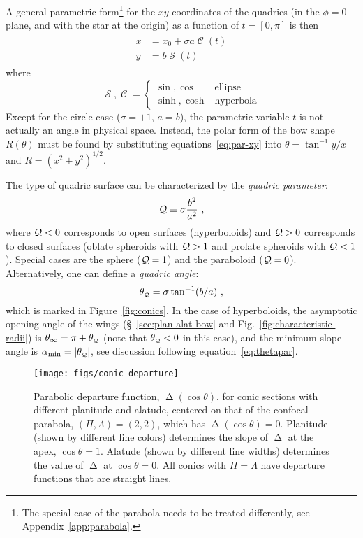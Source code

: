 \documentclass[useAMS, usenatbib, a4paper]{mnras}
\DeclareMathOperator{\Sin}{\mathcal{S}}
\DeclareMathOperator{\Cos}{\mathcal{C}}
\DeclareMathOperator{\Depart}{\Delta}
\providecommand{\abs}[1]{\lvert#1\rvert}
\begin{document}
A general parametric form\footnote{%
  The special case of the parabola needs to be treated differently,
  see Appendix~\ref{app:parabola}.} %
for the \(xy\) coordinates of the quadrics (in the \(\phi = 0\) plane,
and with the star at the origin) as a function of \(t = [0, \pi]\) is
then
\begin{gather}
  \label{eq:par-xy}
  \begin{aligned}
    x &= x_0 + \sigma a \Cos(t) \\ 
    y &= b\Sin(t) 
  \end{aligned}
\end{gather}
where
\begin{equation}
  \label{eq:sin-sinh-etc}
  \Sin{}, \Cos = \begin{cases}
    \sin{}, \cos & \text{ellipse}\\
    \sinh{}, \cosh & \text{hyperbola}
  \end{cases}
\end{equation}
Except for the circle case (\(\sigma = +1\), \(a = b\)), the parametric
variable \(t\) is not actually an angle in physical space.  Instead,
the polar form of the bow shape \(R(\theta)\) must be found by substituting
equations~\eqref{eq:par-xy} into \(\theta = \tan^{-1} y/x\) and
\(R = (x^2 + y^2)^{1/2}\).

The type of quadric surface can be characterized by the
\textit{quadric parameter}:
\begin{equation}
  \label{eq:Tq}
  \mathcal{Q} \equiv \sigma \frac{b^2} {a^2} \ , 
\end{equation}
where \(\mathcal{Q} < 0\) corresponds to open surfaces (hyperboloids) and
\(\mathcal{Q} > 0\) corresponds to closed surfaces (oblate spheroids with
\(\mathcal{Q} > 1\) and prolate spheroids with \(\mathcal{Q} < 1\)).  Special cases are
the sphere (\(\mathcal{Q} = 1\)) and the paraboloid (\(\mathcal{Q} = 0\)).
Alternatively, one can define a \textit{quadric angle}:
\begin{equation}
  \label{eq:thetaQ}
  \theta_{\scriptscriptstyle \mathcal{Q}} = \sigma \tan^{-1} (b/a) \ ,
\end{equation}
which is marked in Figure~\ref{fig:conics}.  In the case of
hyperboloids, the asymptotic opening angle of the wings
(\S~\ref{sec:plan-alat-bow} and Fig.~\ref{fig:characteristic-radii})
is \(\theta_\infty = \pi + \theta_{\scriptscriptstyle \mathcal{Q}}\) (note that \(\theta_{\scriptscriptstyle \mathcal{Q}} < 0\) in this case), and
the minimum slope angle is \(\alpha_{\mathrm{min}} = \abs{\thetaQ}\), see
discussion following equation~\eqref{eq:thetapar}.

\begin{figure}
  \texttt{[image: figs/conic-departure]}
  \caption[]{Parabolic departure function, \(\Depart(\cos\theta)\), for
    conic sections with different planitude and alatude, centered on
    that of the confocal parabola, \((\Pi, \Lambda) = (2, 2)\), which has
    \(\Depart(\cos\theta) = 0\).  Planitude (shown by different line
    colors) determines the slope of \(\Depart\) at the apex,
    \(\cos\theta = 1\).  Alatude (shown by different line widths)
    determines the value of \(\Depart\) at \(\cos\theta = 0\).  All conics
    with \(\Pi = \Lambda\) have departure functions that are straight lines.}
  \label{fig:conic-departure}
\end{figure}
\end{document}
